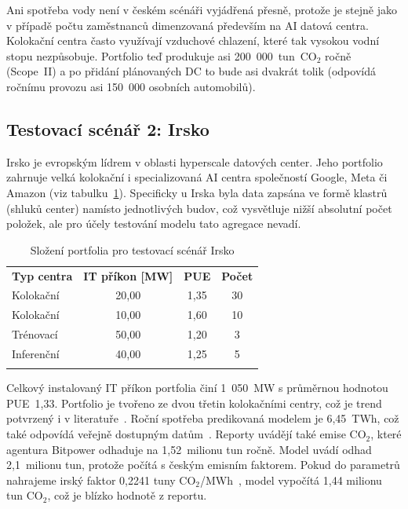 Ani spotřeba vody není v českém scénáři vyjádřená přesně, protože je stejně jako v případě počtu zaměstnanců dimenzovaná především na AI datová centra. Kolokační centra často využívají vzduchové chlazení, které tak vysokou vodní stopu nezpůsobuje. Portfolio teď produkuje asi 200~000~tun~$\text{CO}_2$ ročně (Scope~II) a po přidání plánovaných DC to bude asi dvakrát tolik (odpovídá ročnímu provozu asi 150~000 osobních automobilů).

\subsection{Testovací scénář 2: Irsko}
\label{subsec:testovani_irsko}

Irsko je evropským lídrem v oblasti hyperscale datových center. Jeho portfolio zahrnuje velká kolokační i specializovaná AI centra společností Google, Meta či Amazon (viz tabulku~\ref{tab:portfolio_irsko}). Specificky u Irska byla data zapsána ve formě klastrů (shluků center) namísto jednotlivých budov, což vysvětluje nižší absolutní počet položek, ale pro účely testování modelu tato agregace nevadí.

\begin{table}[b]
    \centering
    \setlength{\tabcolsep}{6pt}

    \caption{Složení portfolia pro testovací scénář Irsko}
    \label{tab:portfolio_irsko}

    \begin{tabular}{p{4cm}ccc}
        \toprule
        \addlinespace

        \textbf{Typ centra} & \textbf{IT příkon [MW]} & \textbf{PUE} & \textbf{Počet} \\

        \addlinespace
        \midrule
        \addlinespace

        Kolokační & 20,00 & 1,35 & 30 \\
        Kolokační & 10,00 & 1,60 & 10 \\
        Trénovací & 50,00 & 1,20 & 3 \\
        Inferenční & 40,00 & 1,25 & 5 \\

        \addlinespace
        \bottomrule
    \end{tabular}
\end{table}

Celkový instalovaný IT příkon portfolia činí 1~050~MW s průměrnou hodnotou PUE~1,33. Portfolio je tvořeno ze dvou třetin kolokačními centry, což je trend potvrzený i v literatuře~\cite{testing_dc_byte_2023}. Roční spotřeba predikovaná modelem je 6,45~TWh, což také odpovídá veřejně dostupným datům~\cite{testing_bitpower_2024}. Reporty uvádějí také emise CO$_2$, které agentura Bitpower odhaduje na 1,52~milionu tun ročně. Model uvádí odhad 2,1~milionu tun, protože počítá s českým emisním faktorem. Pokud do parametrů nahrajeme irský faktor 0,2241 tuny CO$_2$/MWh~\cite{testing_emission_factors_2025}, model vypočítá 1,44 milionu tun CO$_2$, což je blízko hodnotě z reportu.

